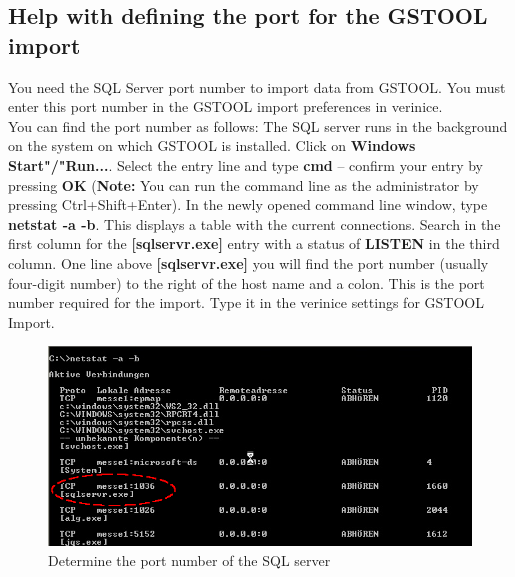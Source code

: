 \documentclass[a4paper,10pt]{book}
\begin{document}
\subsection{Help with defining the port for the GSTOOL import}
You need the SQL Server port number to import data from GSTOOL. You must enter this port number in the GSTOOL import
preferences in verinice.
\newline\\
You can find the port number as follows: The SQL server runs in the background on the system on which GSTOOL is installed.
Click on \textbf{Windows Start"/"Run...}. Select the entry line and type \textbf{cmd} – confirm your entry by pressing \textbf{OK}
(\textbf{Note:} You can run the command line as the administrator by pressing Ctrl+Shift+Enter). In the newly opened command
line window, type \textbf{netstat -a -b}. This displays a table with the current connections. Search in the first column for the
\textbf{[sqlservr.exe]} entry with a status of \textbf{LISTEN} in the third column. One line above
\textbf{[sqlservr.exe]} you will find the port number (usually four-digit number) to the right of the host name and a colon.
This is the port number required for the import. Type it in the verinice settings for GSTOOL Import.
\newline
\begin{figure}[htb!]
  \centering
  \includegraphics[scale=.7]{Screenshot/Verinice_netstat_gstool-en.png}
  \caption{\label{Determine the port number of the SQL server} Determine the port number of the SQL server}
\end{figure}
\newline
\end{document}
